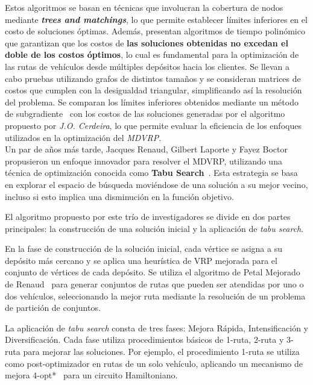 \documentclass[letter, 10pt]{article}
\begin{document}
Estos algoritmos se basan en técnicas que involucran la cobertura de nodos mediante \textbf{\textit{trees and matchings}}, lo que permite establecer límites inferiores en el costo de soluciones óptimas. Además, presentan algoritmos de tiempo polinómico que garantizan que los costos de \textbf{las soluciones obtenidas no excedan el doble de los costos óptimos}, lo cual es fundamental para la optimización de las rutas de vehículos desde múltiples depósitos hacia los clientes. Se llevan a cabo pruebas utilizando grafos de distintos tamaños y se consideran matrices de costos que cumplen con la desigualdad triangular, simplificando así la resolución del problema. Se comparan los límites inferiores obtenidos mediante un método de subgradiente~\cite{ValidationOfSubgradient} con los costos de las soluciones generadas por el algoritmo propuesto por \textit{J.O. Cerdeira}, lo que permite evaluar la eficiencia de los enfoques utilizados en la optimización del \textit{MDVRP}.
\\

Un par de años más tarde, Jacques Renaud, Gilbert Laporte y Fayez Boctor propusieron un enfoque innovador para resolver el MDVRP, utilizando una técnica de optimización conocida como \textbf{Tabu Search}~\cite{TabuSearchHeuristic}. Esta estrategia se basa en explorar el espacio de búsqueda moviéndose de una solución a su mejor vecino, incluso si esto implica una disminución en la función objetivo.

El algoritmo propuesto por este trío de investigadores se divide en dos partes principales: la construcción de una solución inicial y la aplicación de \textit{tabu search}.

En la fase de construcción de la solución inicial, cada vértice se asigna a su depósito más cercano y se aplica una heurística de VRP mejorada para el conjunto de vértices de cada depósito. Se utiliza el algoritmo de Petal Mejorado de Renaud~\cite{PetalHeuristic} para generar conjuntos de rutas que pueden ser atendidas por uno o dos vehículos, seleccionando la mejor ruta mediante la resolución de un problema de partición de conjuntos.

La aplicación de \textit{tabu search} consta de tres fases: Mejora Rápida, Intensificación y Diversificación. Cada fase utiliza procedimientos básicos de 1-ruta, 2-ruta y 3-ruta para mejorar las soluciones. Por ejemplo, el procedimiento 1-ruta se utiliza como post-optimizador en rutas de un solo vehículo, aplicando un mecanismo de mejora 4-opt*~\cite{ComputerSolutions} para un circuito Hamiltoniano.
\end{document}

